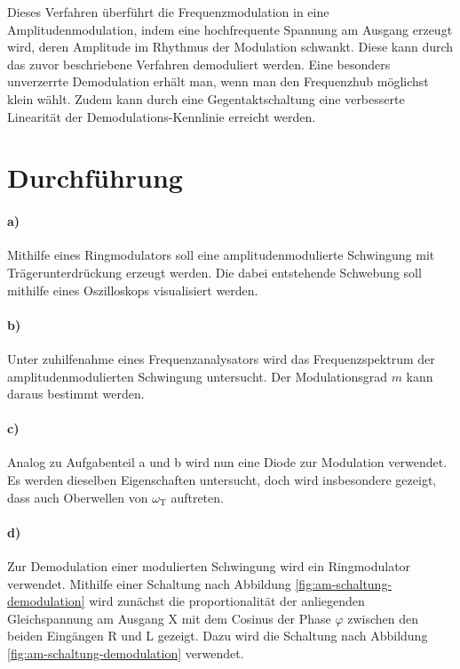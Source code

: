 Dieses Verfahren überführt die Frequenzmodulation in eine Amplitudenmodulation, indem eine hochfrequente Spannung am Ausgang erzeugt wird, deren Amplitude im Rhythmus der Modulation schwankt.
Diese kann durch das zuvor beschriebene Verfahren demoduliert werden.
Eine besonders unverzerrte Demodulation erhält man, wenn man den Frequenzhub möglichst klein wählt.
Zudem kann durch eine Gegentaktschaltung eine verbesserte Linearität der Demodulations-Kennlinie erreicht werden.

\section{Durchführung}
\label{sec:durchführung}

\paragraph{a)}
Mithilfe eines Ringmodulators soll eine amplitudenmodulierte Schwingung mit Trägerunterdrückung erzeugt werden.
Die dabei entstehende Schwebung soll mithilfe eines Oszilloskops visualisiert werden.

\paragraph{b)}
Unter zuhilfenahme eines Frequenzanalysators wird das Frequenzspektrum der amplitudenmodulierten Schwingung untersucht.
Der Modulationsgrad $m$ kann daraus bestimmt werden.

\paragraph{c)}
Analog zu Aufgabenteil a und b wird nun eine Diode zur Modulation verwendet.
Es werden dieselben Eigenschaften untersucht, doch wird insbesondere gezeigt, dass auch Oberwellen von $\omega_\text{T}$ auftreten.

\paragraph{d)}
\label{par:d_}
Zur Demodulation einer modulierten Schwingung wird ein Ringmodulator verwendet.
Mithilfe einer Schaltung nach Abbildung \ref{fig:am-schaltung-demodulation} wird zunächst die proportionalität der anliegenden Gleichspannung am Ausgang X mit dem Cosinus der Phase $\varphi$ zwischen den beiden Eingängen R und L gezeigt.
Dazu wird die Schaltung nach Abbildung \ref{fig:am-schaltung-demodulation} verwendet.

